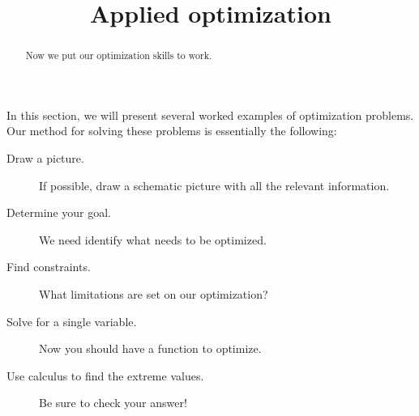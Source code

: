 \documentclass{ximera}
\title[Dig-In:]{Applied optimization}
\begin{document}
\begin{abstract}
  Now we put our optimization skills to work.
\end{abstract}
\maketitle


In this section, we will present several worked examples of
optimization problems. Our method for solving these problems is
essentially the following:
\begin{description}
\item[Draw a picture.] If possible, draw a schematic picture with all the relevant information. 
\item[Determine your goal.] We need identify what needs to be
  optimized.
\item[Find constraints.] What limitations are set on our
  optimization?
\item[Solve for a single variable.] Now you should have a function to optimize.
\item[Use calculus to find the extreme values.] Be sure to check your answer!
\end{description}
\end{document}
